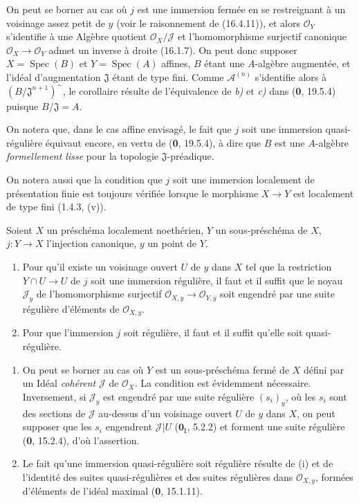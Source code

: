 On peut se borner au cas où $j$ est une immersion fermée en se restreignant
à un voisinage assez petit de $y$ (voir le raisonnement de (16.4.11)), et
alors $\mathcal{O}_Y$ s'identifie à une Algèbre quotient
$\mathcal{O}_X/\mathscr{J}$ et l'homomorphisme surjectif canonique
$\mathcal{O}_X\to\mathcal{O}_Y$ admet un
inverse à droite (16.1.7). On peut donc supposer
$X=\operatorname{Spec}(B)$ et $Y=\operatorname{Spec}(A)$ affines, $B$ étant
une $A$-algèbre augmentée, et l'idéal d'augmentation $\mathfrak{J}$ étant de
type fini. Comme $\mathscr{A}^{(n)}$ s'identifie alors à
$(B/\mathfrak{J}^{n+1})^{\sim}$, le corollaire résulte de l'équivalence de \emph{b)}
et \emph{c)} dans (\textbf{0}, 19.5.4) puisque $B/\mathfrak{J}=A$.

On notera que, dans le cas affine envisagé, le fait que $j$ soit une immersion
quasi-régulière équivaut encore, en vertu de (\textbf{0}, 19.5.4), à dire que $B$ est
une $A$-algèbre \emph{formellement lisse} pour la topologie
$\mathfrak{J}$-préadique.

On notera aussi que la condition que $j$ soit une immersion localement de
présentation finie est toujours vérifiée lorsque le morphisme $X\to Y$ est
localement de type fini (1.4.3, (v)).

\begin{proposition}[16.9.10]
Soient $X$ un préschéma localement noethérien, $Y$ un sous-préschéma de $X$,
$j:Y\to X$ l'injection canonique, $y$ un point de $Y$.
\begin{enumerate}
  \item[\textup{(i)}] Pour qu'il existe un voisinage ouvert $U$ de $y$ dans $X$ tel que
  la restriction $Y\cap U\to U$ de $j$ soit une immersion régulière, il faut
  et il suffit que le noyau $\mathscr{J}_y$ de l'homomorphisme surjectif
  $\mathcal{O}_{X,y}\to\mathcal{O}_{Y,y}$ soit engendré par une suite régulière
  d'éléments de $\mathcal{O}_{X,y}$.
  \item[\textup{(ii)}] Pour que l'immersion $j$ soit régulière, il faut et il suffit
  qu'elle soit quasi-régulière.
\end{enumerate}
\end{proposition}

\begin{enumerate}
  \item[(i)] On peut se borner au cas où $Y$ est un sous-préschéma fermé de
  $X$ défini par un Idéal \emph{cohérent} $\mathscr{J}$ de $\mathcal{O}_X$.
  La condition est évidemment nécessaire. Inversement, si $\mathscr{J}_y$
  est engendré par une suite régulière $(s_i)_y$, où les $s_i$ sont des
  sections de $\mathscr{J}$ au-dessus d'un voisinage ouvert $U$ de $y$ dans
  $X$, on peut supposer que les $s_i$ engendrent $\mathscr{J}|U$
  ($\mathbf{0}_{\mathrm I}$, 5.2.2) et forment une suite régulière (\textbf{0}, 15.2.4),
  d'où l'assertion.
  \item[(ii)] Le fait qu'une immersion quasi-régulière soit régulière résulte
  de (i) et de l'identité des suites quasi-régulières et des suites régulières
  dans $\mathcal{O}_{X,y}$, formées d'éléments de l'idéal maximal
  (\textbf{0}, 15.1.11).
\end{enumerate}

